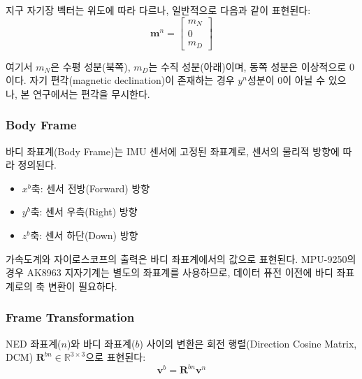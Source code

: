            지구 자기장 벡터는 위도에 따라 다르나, 일반적으로 다음과 같이 표현된다:\\

            \begin{equation}
                \mathbf{m}^n = \begin{bmatrix} m_N \\ 0 \\ m_D \end{bmatrix}
                \label{eq:mag_ned}
            \end{equation}

            \noindent 여기서 $m_N$은 수평 성분(북쪽), $m_D$는 수직 성분(아래)이며, 동쪽 성분은 이상적으로 0이다. 자기 편각(magnetic declination)이 존재하는 경우 $y^n$성분이 0이 아닐 수 있으나, 본 연구에서는 편각을 무시한다.\\

        \subsubsection{Body Frame}
            바디 좌표계(Body Frame)는 IMU 센서에 고정된 좌표계로, 센서의 물리적 방향에 따라 정의된다.\\

            \begin{itemize}
                \item $x^b$축: 센서 전방(Forward) 방향
                \item $y^b$축: 센서 우측(Right) 방향
                \item $z^b$축: 센서 하단(Down) 방향
            \end{itemize}

            가속도계와 자이로스코프의 출력은 바디 좌표계에서의 값으로 표현된다. MPU-9250의 경우 AK8963 지자기계는 별도의 좌표계를 사용하므로, 데이터 퓨전 이전에 바디 좌표계로의 축 변환이 필요하다.\\

        \subsubsection{Frame Transformation}
            NED 좌표계($n$)와 바디 좌표계($b$) 사이의 변환은 회전 행렬(Direction Cosine Matrix, DCM) $\mathbf{R}^{bn} \in \mathbb{R}^{3\times 3}$으로 표현된다:\\

            \begin{equation}
                \mathbf{v}^b = \mathbf{R}^{bn} \mathbf{v}^n
                \label{eq:frame_transform}
            \end{equation}

